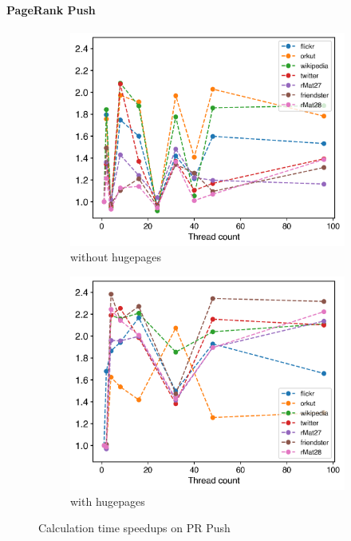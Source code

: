 \paragraph{PageRank Push}
\begin{figure}
	\hfil
	\begin{subfigure}{0.4\textwidth}
		\includegraphics[width=\linewidth]{../../plots/singleNodePRPushGaloisThreads.png}
		\caption{without hugepages}
		\label{fig:galoisSpeedupPRPush_noHP}
	\end{subfigure}
	\begin{subfigure}{0.4\textwidth}
		\includegraphics[width=\linewidth]{../../plots/singleNodePRPushGaloisHPThreads.png}
		\caption{with hugepages}
		\label{fig:galoisSpeedupPRPush_HP}
	\end{subfigure}
	\hfil
	\caption{Calculation time speedups on PR Push}
	\label{fig:galoisSpeedupPRPush}
\end{figure}

